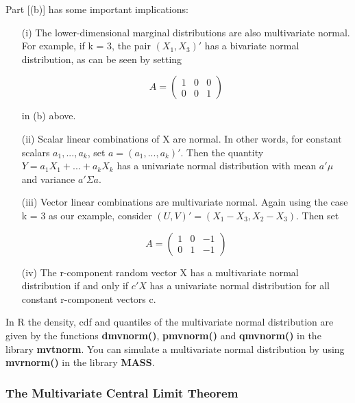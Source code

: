 Part [(b)] has some important implications:

\begin{itemize}

   \item [(i)] The lower-dimensional marginal distributions are also
   multivariate normal.  For example, if k = 3, the pair $(X_1,X_3)'$
   has a bivariate normal distribution, as can be seen by setting 

   \begin{equation} A = \left ( \begin{array}{ccc} 1 & 0 & 0\\ 0 & 0 & 1
   \end{array} \right )     \end{equation}

   in (b) above.
   
   \item [(ii)] Scalar linear combinations of X are normal.  In other
   words, for constant scalars $a_1,...,a_k$, set $a = (a_1,...,a_k)'$.
   Then the quantity $Y = a_1 X_1 +...+ a_k X_k$ has a univariate normal
   distribution with mean  $a' \mu$ and variance $a' \Sigma a$. 

   \item [(iii)] Vector linear combinations are multivariate normal.
   Again using the case k = 3 as our example, consider $(U,V)' =
   (X_1-X_3,X_2-X_3)$.  Then set

   \begin{equation}
   A = 
      \left (
      \begin{array}{ccc}
      1 & 0 & -1\\
      0 & 1 & -1   
      \end{array}
      \right )     
   \end{equation}

   \item [(iv)] The r-component random vector X has a multivariate normal
   distribution if and only if $c'X$ has a univariate normal
   distribution for all constant r-component vectors c.

\end{itemize}

In R the density, cdf and quantiles of the multivariate normal
distribution are given by the functions {\bf dmvnorm()}, {\bf pmvnorm()} 
and {\bf qmvnorm()} in the library {\bf mvtnorm}.  You can simulate a
multivariate normal distribution by using {\bf mvrnorm()} in the library
{\bf MASS}.

\subsubsection{The Multivariate Central Limit Theorem}

